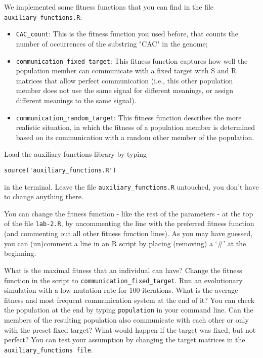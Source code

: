 \documentclass[a4paper, 9pt]{article}
\begin{document}
We implemented some fitness functions that you can find in the file
\texttt{auxiliary\_functions.R}:

\begin{itemize}
\item \texttt{CAC\_count}: This is the fitness function you used before, that counts the number of occurrences of the substring "CAC" in the genome;
\item \texttt{communication\_fixed\_target}: This fitness function captures how well the population member can communicate with a fixed target with S and R matrices that allow perfect communication (i.e., this other population member does not use the same signal for different meanings, or assign different meanings to the same signal).
\item \texttt{communication\_random\_target}: This fitness function describes the more realistic situation, in which the fitness of a population member is determined based on its communication with a random other member of the population.
\end{itemize}

\begin{exercise}
\action Load the auxiliary functions library by typing 
\begin{lstlisting}
source('auxiliary_functions.R')
\end{lstlisting}
in the terminal. Leave the file \texttt{auxiliary\_functions.R} untouched, you don't have to change anything there.
\end{exercise}

You can change the fitness function - like the rest of the parameters -
at the top of the file \texttt{lab-2.R}, by uncommenting the line with
the preferred fitness function (and commenting out all other fitness
function lines). As you may have guessed, you can (un)comment a line in
an R script by placing (removing) a `\#' at the beginning.

\begin{exercise}
\ask What is the maximal fitness that an individual can have?
\action Change the fitness function in the script to \texttt{communication\_fixed\_target}. Run an evolutionary simulation with a low mutation rate for 100 iterations. What is the average fitness and most frequent communication system at the end of it? You can check the population at the end by typing \texttt{population} in your command line.
\ask Can the members of the resulting population also communicate with each other or only with the preset fixed target?
\ask What would happen if the target was fixed, but not perfect? You can test your assumption by changing the target matrices in the \texttt{auxiliary\_functions file}. 
\end{exercise}
\end{document}
